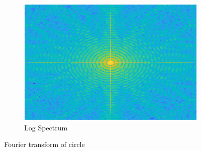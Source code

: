 \begin{figure}[!ht]
\begin{subfigure}{0.32\textwidth}
        \centering
        \includegraphics[width=\textwidth]{Doc/Graphics/Part1/Q13_log_Circle.png}
        \caption{Log Spectrum}
    \end{subfigure}
    \caption{Fourier transform of circle}
\end{figure}
